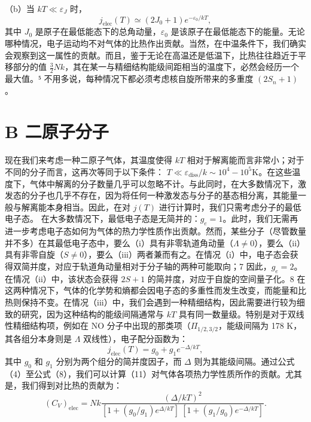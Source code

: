 （b）当 \(kT \ll \varepsilon_J\) 时，
\begin{equation}\tag{6.5.15}\label{eq:6.5.15}
j _ { \mathrm { e l e c } } ( T ) \simeq ( 2 J _ { 0 } + 1 ) e ^{- \varepsilon _ { 0} / k T } ,
\end{equation}
其中 \(J_{0}\) 是原子在最低能态下的总角动量，\(\varepsilon_{0}\) 是该原子在最低能态下的能量。无论哪种情况，电子运动均不对气体的比热作出贡献。当然，在中温条件下，我们确实会观察到这一属性的贡献。而且，鉴于无论在高温还是低温下，比热往往趋近于平移部分的值 \(\frac{3}{2}Nk\)，其在某一与精细结构能级间距相当的温度下，必然会经历一个最大值。⁵ 不用多说，每种情况下都必须考虑核自旋所带来的多重度 \((2S_{n}+1)\)。
\section{B 二原子分子}\label{b-ux4e8cux539fux5b50ux5206ux5b50}
现在我们来考虑一种二原子气体，其温度使得 \(kT\) 相对于解离能而言非常小；对于不同的分子而言，这再次等同于以下条件：
\(T \ll \varepsilon_{\mathrm{diss}} / k \sim 10^{4}-10^{5} \mathrm{K}\)。在这些温度下，气体中解离的分子数量几乎可以忽略不计。与此同时，在大多数情况下，激发态的分子也几乎不存在，因为将任何一种激发态与分子的基态相分离，其能量一般与解离能本身相当。因此，在对 \(j(T)\) 进行计算时，我们只需考虑分子的最低电子态。
在大多数情况下，最低电子态是无简并的：\(g_{e}=1\)。此时，我们无需再进一步考虑电子态如何为气体的热力学性质作出贡献。然而，某些分子（尽管数量并不多）在其最低电子态中，要么（i）具有非零轨道角动量（\(\Lambda\neq0\)），要么（ii）具有非零自旋（\(S\neq0\)），要么（iii）两者兼而有之。在情况（i）中，电子态会获得双简并度，对应于轨道角动量相对于分子轴的两种可能取向；7 因此，\(g_{e}=2\)。在情况（ii）中，该状态会获得 \(2S+1\) 的简并度，对应于自旋的空间量子化。8
在这两种情况下，气体的化学势和熵都会因电子态的多重性而发生改变，而能量和比热则保持不变。在情况（iii）中，我们会遇到一种精细结构，因此需要进行较为细致的研究，因为这种结构的能级间隔通常与 \(kT\) 具有同一数量级。特别是对于双线性精细结构项，例如在 NO 分子中出现的那类项（\(\Pi_{1/2,3/2}\)，能级间隔为 178 K，其各组分本身则是 \(\Lambda\) 双线性），电子配分函数为：
\begin{equation}\tag{6.5.16}\label{eq:6.5.16}
j _ { \mathrm { e l e c } } ( T ) = g _ { 0 } + g _ { 1 } e ^{- \Delta / k T} ,
\end{equation}
其中 \(g_{0}\) 和 \(g_{1}\) 分别为两个组分的简并度因子，而 \(\Delta\) 则为其能级间隔。通过公式（4）至公式（8），我们可以计算（11）对气体各项热力学性质所作的贡献。尤其是，我们得到对比热的贡献为：
\begin{equation}\tag{6.5.17}\label{eq:6.5.17}
( C _ { V } ) _ { \mathrm { e l e c } } = N k \frac { ( \Delta / k T ) ^{2} } { [ 1 + ( g _ { 0 } / g _ { 1 } ) e ^{\Delta / k T} ] \ [ 1 + ( g _ { 1 } / g _ { 0 } ) e ^{- \Delta / k T} ] } .
\end{equation}

